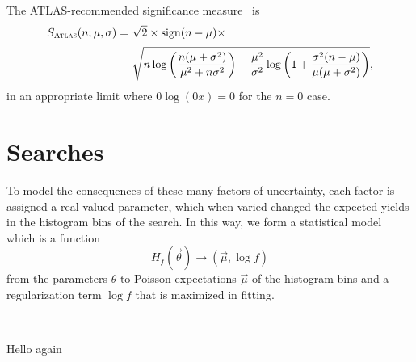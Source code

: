 The ATLAS-recommended significance measure~\cite{atlas_significance} is
\begin{align}
\label{eqn:significance_atlas}
S_\mathrm{\textsc{Atlas}}(n; \mu, \sigma) =~&
\sqrt{2} \times
\mathrm{sign}(n - \mu) \times
\\[0.2em] \nonumber
&
\sqrt{
n\log\left(\frac{n(\mu + \sigma^2)}{\mu^2 + n\sigma^2}\right)
- \frac{\mu^2}{\sigma^2}\log\left(
1 + \frac{\sigma^2(n - \mu)}{\mu(\mu + \sigma^2)}
\right)
}
,
\end{align}
in an appropriate limit where $0\log(0x) = 0$ for the $n=0$ case.


\section{Searches}
\label{sec:searches_searches}

To model the consequences of these many factors of uncertainty, each factor is
assigned a real-valued parameter, which when varied changed the expected yields
in the histogram bins of the search.
In this way, we form a statistical model which is a function
\begin{equation}
H_{\!f}(\vec \theta) \rightarrow (\vec \mu, \log f)
\end{equation}
from the parameters $\theta$ to Poisson expectations $\vec\mu$ of the histogram
bins and a regularization term $\log f$ that is maximized in fitting.

\histfactory~\cite{cranmer2012histfactory}
\pyhf~\cite{heinrich2021pyhf}
\histfitter~\cite{Besjes_2015,baak2015histfitter}


\clearpage

Hello again
